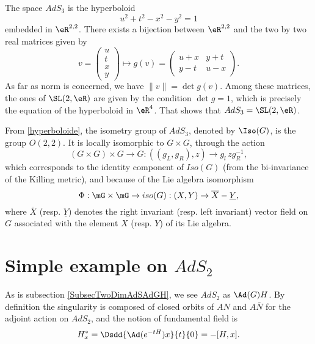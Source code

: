 The space $AdS_3$ is the hyperboloid 
\begin{equation} \label{hyperboloide}
 u^2 + t^2 - x^2 - y^2 = 1
 \end{equation}
embedded in $\eR^{2,2}$. There exists a bijection between $\eR^{2,2}$ and the two by two real matrices given by
\[ 
 v= \begin{pmatrix}
u\\t\\x\\y
\end{pmatrix}
\mapsto
g(v)=\begin{pmatrix}
u+x&y+t\\
y-t&u-x
\end{pmatrix}.
\]
As far as norm is concerned, we have $\| v \|=\det g(v)$. Among these matrices, the ones of $\SL(2,\eR)$ are given by the condition $\det g=1$, which is precisely the equation of the hyperboloid in $\eR^{4}$. That shows that $AdS_3=\SL(2,\eR)$.

From \eqref{hyperboloide}, the isometry group of $AdS_3$, denoted by $\Iso(G)$, is the group $O(2,2)$. It is locally isomorphic to $G \times G$, through the action
\begin{equation}
 (G \times G) \times G \longrightarrow G \colon((g_L,g_R),z)
 \rightarrow g_l \, z g_R^{-1},
 \end{equation}
 which corresponds to the identity component of $Iso(G)$ (from the bi-invariance of the Killing metric), and because of the Lie algebra isomorphism
\begin{equation}\label{Iso}
 \Phi: \mG \times \mG \rightarrow iso(G) : (X,Y)
 \rightarrow  \overline{X} - \underline{Y},
\end{equation}
where $\overline{X}$ (resp. $\underline{Y}$) denotes the right invariant (resp. left invariant) vector field on $G$ associated with the element $X$ (resp. $Y$) of its Lie algebra.

\section{Simple example on \texorpdfstring{$AdS_{2}$}{AdS2}}\label{sec_AdSdeux}

As is subsection \ref{SubsecTwoDimAdSAdGH}, we see $AdS_2$ as $\Ad(G)H$. By definition the singularity is composed of closed orbits of $AN$ and $A\bar{N}$ for the adjoint action on $AdS_2$, and the notion of fundamental field is
\begin{equation}
H^*_x=\Dsdd{\Ad(e^{-tH})x}{t}{0} =-[H,x].
\end{equation}

